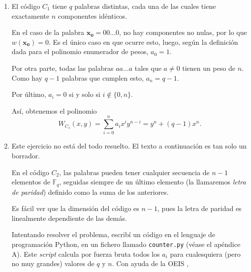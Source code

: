 \begin{enumerate}[label=\alph*)]
	\item El código $C_1$ tiene $q$ palabras distintas, cada una de las cuales tiene exactamente $n$ componentes idénticos.
	
	En el caso de la palabra $\mathbf{x_0} = 00\dots0$, no hay componentes no nulas, por lo que $w(\mathbf{x_0}) = 0$. Es el único caso en que ocurre esto, luego, según la definición dada para el polinomio enumerador de pesos, $a_0 = 1$.
	
	Por otra parte, todas las palabras $aa\dots a$ tales que $a\neq0$ tienen un peso de $n$. Como hay $q-1$ palabras que cumplen esto, $a_n = q-1$.
	
	Por último, $a_i = 0$ si y solo si $i \notin \{0, n\}$.
	
	Así, obtenemos el polinomio
	\[W_{C_1}(x, y) = \sum_{i=0}^n a_i x^i y^{n-i} = y^n + (q-1)x^n.\]
	
	\item \hspace*{1mm}
	
	\begin{draftBox}
		Este ejercicio no está del todo resuelto. El texto a continuación es tan solo un borrador.
	\end{draftBox}
	
	En el código $C_2$, las palabras pueden tener cualquier secuencia de $n-1$ elementos de $\mathbb{F}_q$, seguidas siempre de un último elemento (la llamaremos \textit{letra de paridad}) definido como la suma de los anteriores.
	
	
	
	
	Es fácil ver que la dimensión del código es $n-1$, pues la letra de paridad es linealmente dependiente de las demás.
	
	Intentando resolver el problema, escribí un código en el lenguaje de programación Python, en un fichero llamado \texttt{counter.py} (véase el apéndice A). Este \textit{script} calcula por fuerza bruta todos los $a_i$ para cualesquiera (pero no muy grandes) valores de $q$ y $n$. Con ayuda de la OEIS \cite{OEIS:A109499},
	

\end{enumerate}
